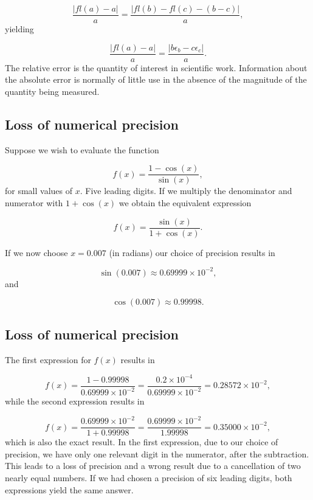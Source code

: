 \documentclass[%
oneside,                 %
final,                   %
10pt]{article}
\begin{document}
\begin{equation}
   \frac{ |fl(a)-a|}{a}=\frac{ |fl(b)-fl(c)-(b-c)|}{a},
\end{equation}
yielding

\begin{equation}
   \frac{ |fl(a)-a|}{a}=\frac{ |b\epsilon_b- c\epsilon_c|}{a}.
\end{equation}
The relative error
is the quantity of interest in scientific work. Information about the
absolute error is normally of little use in the absence of the magnitude
of the quantity being measured.



\subsection*{Loss of numerical precision}

Suppose we wish to evaluate the function

\[
   f(x)=\frac{1-\cos(x)}{\sin(x)},
\]
for small values of $x$. Five leading digits. If we multiply the denominator and numerator
with $1+\cos(x)$ we obtain the equivalent expression

\[
   f(x)=\frac{\sin(x)}{1+\cos(x)}.
\]

If we now choose $x=0.007$ (in radians) our choice of precision results in

\[
   \sin(0.007)\approx 0.69999\times 10^{-2},
\]
and

\[
   \cos(0.007)\approx 0.99998.
\]

\subsection*{Loss of numerical precision}

The first expression for $f(x)$ results in

\[
   f(x)=\frac{1-0.99998}{0.69999\times 10^{-2}}=\frac{0.2\times 10^{-4}}{0.69999\times 10^{-2}}=0.28572\times 10^{-2},
\]
while the second expression results in

\[
   f(x)=\frac{0.69999\times 10^{-2}}{1+0.99998}=
\frac{0.69999\times 10^{-2}}{1.99998}=0.35000\times 10^{-2},
\]
which is also the exact result. In the first expression, due to our
choice of precision, we have
only one relevant digit in the numerator, after the
subtraction. This leads to a loss of precision and a wrong result due to
a cancellation of two nearly equal numbers.
If we had chosen a precision of six leading digits, both expressions
yield the same answer.
\end{document}
